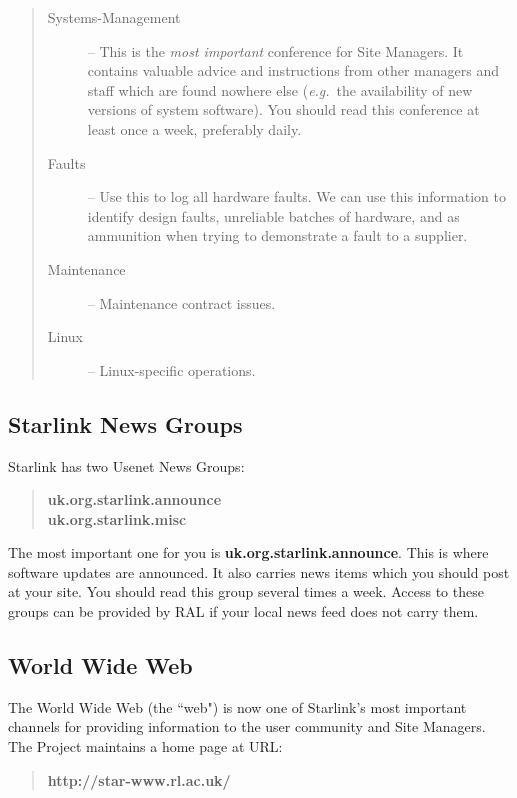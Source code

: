 \documentclass[twoside,11pt]{article}
\newcommand{\htmladdnormallink}[2]{#1}
\begin{document}
\begin{quote}
\begin{description}
\item [Systems-Management] --
 This is the {\em most important} conference for Site Managers.
 It contains valuable advice and instructions from other managers and
 staff which are found nowhere else ({\em e.g.}\ the availability of new
 versions of system software).
 You should read this conference at least once a week, preferably daily.
\item [Faults] --
 Use this to log all hardware faults.
 We can use this information to identify design faults, unreliable batches of
 hardware, and as ammunition when trying to demonstrate a fault to a supplier. 
\item [Maintenance] --
 Maintenance contract issues.
\item [Linux] --
 Linux-specific operations.
\end{description}
\end{quote}

\subsection{Starlink News Groups}

Starlink has two Usenet News Groups:

\begin{quote}
{\bf uk.org.starlink.announce\\
     uk.org.starlink.misc}
\end{quote}

The most important one for you is {\bf uk.org.starlink.announce}.
This is where software updates are announced.
It also carries news items which you should post at your site.
You should read this group several times a week. 
Access to these groups can be provided by RAL if your local news feed
does not carry them.

\subsection{\label{web}World Wide Web}

The World Wide Web (the ``web") is now one of Starlink's most important
channels for providing information to the user community and Site Managers.
The Project maintains a home page at URL:

\begin{quote}
\htmladdnormallink{{\bf http://star-www.rl.ac.uk/}}{http://star-www.rl.ac.uk/}
\end{quote}
\end{document}
